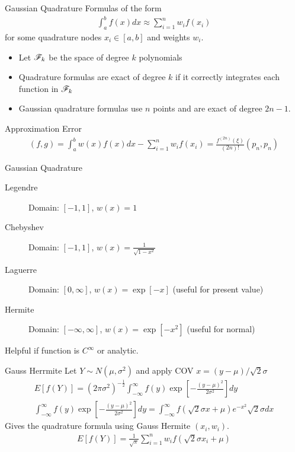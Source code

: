 \documentclass[aspectratio=169,11pt]{beamer}
\begin{document}
\begin{frame}{Gaussian Quadrature}
Formulas of the form
\begin{eqnarray*}
\int_{a}^b f(x) d x \approx \sum_{i=1}^n  w_i f(x_i)
\end{eqnarray*}
for some quadrature nodes $x_i \in [a,b]$ and weights $w_i$.
\begin{itemize}
\item Let $\mathscr{F}_k$ be the space of degree $k$ polynomials
\item Quadrature formulas are exact of degree $k$ if it correctly integrates each function in $\mathscr{F}_k$
\item Gaussian quadrature formulas use $n$ points and are exact of degree $2n-1$.
\end{itemize}
Approximation Error
\begin{eqnarray*}
(f,g) = \int_a^b w(x) f(x)  dx - \sum_{i=1}^n w_i f(x_i) = \frac{f^{(2n)}(\xi)}{(2n)!} (p_n,p_n) 
\end{eqnarray*}
\end{frame}

\begin{frame}{Gaussian Quadrature}
\begin{description}
\item[Legendre] Domain: $[-1,1]$, $w(x) = 1$
\item[Chebyshev] Domain: $[-1,1]$, $w(x) = \frac{1}{\sqrt{1-x^2}}$
\item[Laguerre] Domain: $[0,\infty]$, $w(x) = \exp[-x]$ (useful for present value)
\item[Hermite] Domain: $[-\infty,\infty]$, $w(x) = \exp[-x^2]$ (useful for normal)
\end{description}
Helpful if function is $C^{\infty}$ or analytic.
\end{frame}

\begin{frame}{Gauss Herrmite}
Let $Y\sim N(\mu,\sigma^2)$ and apply COV $x = (y-\mu)/\sqrt{2} \sigma$
\begin{eqnarray*}
E[f(Y)] = (2 \pi \sigma^2)^{-\frac{1}{2}} \int_{-\infty}^{\infty} f(y) \exp\left[-\frac{(y-\mu)^2}{2\sigma^2} \right] dy \\
\int_{-\infty}^{\infty} f(y) \exp\left[-\frac{(y-\mu)^2}{2\sigma^2} \right] dy = \int_{-\infty}^{\infty} f(\sqrt{2} \sigma x + \mu) e^{-x^2} \sqrt{2} \sigma dx
\end{eqnarray*}
Gives the quadrature formula using Gauss Hermite $(x_i,w_i)$.
\begin{eqnarray*}
E[f(Y)] = \frac{1}{\sqrt{\pi}} \sum_{i=1}^n w_i f(\sqrt{2}\sigma x_i + \mu)
\end{eqnarray*}
\end{frame}
\end{document}
